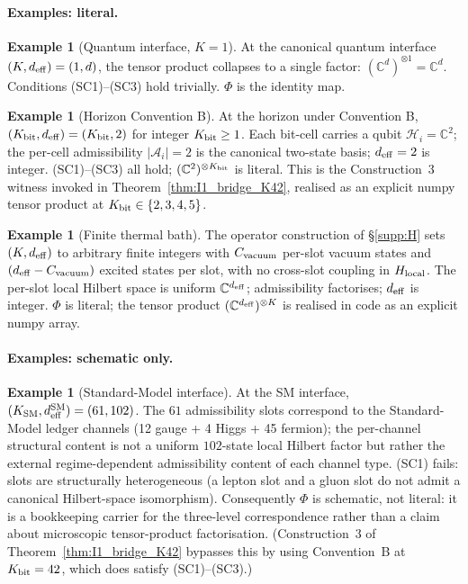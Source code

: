 \documentclass[11pt]{article}
\theoremstyle{plain}
\theoremstyle{definition}
\newtheorem{example}[theorem]{Example}
\theoremstyle{remark}
\begin{document}
\paragraph{Examples: literal.}

\begin{example}[Quantum interface, $K = 1$]\label{ex:lit_K1}
At the canonical quantum interface $(K, d_{\rm eff}) = (1, d)$, the tensor product collapses to a single factor: $(\mathbb{C}^d)^{\otimes 1} = \mathbb{C}^d$.  Conditions (SC1)--(SC3) hold trivially.  $\Phi$ is the identity map.
\end{example}

\begin{example}[Horizon Convention B]\label{ex:lit_convB}
At the horizon under Convention B, $(K_{\rm bit}, d_{\rm eff}) = (K_{\rm bit}, 2)$ for integer $K_{\rm bit} \geq 1$.  Each bit-cell carries a qubit $\mathcal{H}_i = \mathbb{C}^2$; the per-cell admissibility $|\mathcal{A}_i| = 2$ is the canonical two-state basis; $d_{\rm eff} = 2$ is integer.  (SC1)--(SC3) all hold; $(\mathbb{C}^2)^{\otimes K_{\rm bit}}$ is literal.  This is the Construction~3 witness invoked in Theorem~\ref{thm:I1_bridge_K42}, realised as an explicit numpy tensor product at $K_{\rm bit} \in \{2, 3, 4, 5\}$.
\end{example}

\begin{example}[Finite thermal bath]\label{ex:lit_thermal}
The operator construction of \S\ref{supp:H} sets $(K, d_{\rm eff})$ to arbitrary finite integers with $C_{\rm vacuum}$ per-slot vacuum states and $(d_{\rm eff} - C_{\rm vacuum})$ excited states per slot, with no cross-slot coupling in $H_{\rm local}$.  The per-slot local Hilbert space is uniform $\mathbb{C}^{d_{\rm eff}}$; admissibility factorises; $d_{\rm eff}$ is integer.  $\Phi$ is literal; the tensor product $(\mathbb{C}^{d_{\rm eff}})^{\otimes K}$ is realised in code as an explicit numpy array.
\end{example}

\paragraph{Examples: schematic only.}

\begin{example}[Standard-Model interface]\label{ex:sch_SM}
At the SM interface, $(K_{\rm SM}, d_{\rm eff}^{\rm SM}) = (61, 102)$.  The $61$ admissibility slots correspond to the Standard-Model ledger channels (12 gauge + 4 Higgs + 45 fermion); the per-channel structural content is not a uniform $102$-state local Hilbert factor but rather the external regime-dependent admissibility content of each channel type.  (SC1) fails: slots are structurally heterogeneous (a lepton slot and a gluon slot do not admit a canonical Hilbert-space isomorphism).  Consequently $\Phi$ is schematic, not literal: it is a bookkeeping carrier for the three-level correspondence rather than a claim about microscopic tensor-product factorisation.  (Construction~3 of Theorem~\ref{thm:I1_bridge_K42} bypasses this by using Convention~B at $K_{\rm bit} = 42$, which does satisfy (SC1)--(SC3).)
\end{example}
\end{document}
